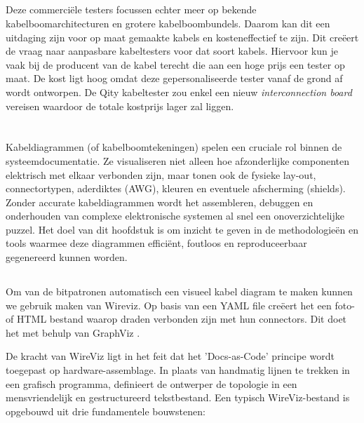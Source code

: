 \subsection{} 
\label{ssec:TesterOpMaat}

Deze commerciële testers focussen echter meer op bekende kabelboomarchitecturen en grotere kabelboombundels. Daarom kan dit een uitdaging zijn voor op maat gemaakte kabels\autocite{Khouri2021} en kosteneffectief te zijn. Dit creëert de vraag naar aanpasbare kabeltesters voor dat soort kabels. Hiervoor kun je vaak bij de producent van de kabel terecht die aan een hoge prijs een tester op maat. De kost ligt hoog omdat deze gepersonaliseerde tester vanaf de grond af wordt ontworpen. De Qity kabeltester zou enkel een nieuw \textit{interconnection board} vereisen waardoor de totale kostprijs lager zal liggen.

\section{} 
\label{sec:KabelDiagrammen}

Kabeldiagrammen (of kabelboomtekeningen) spelen een cruciale rol binnen de systeemdocumentatie. Ze visualiseren niet alleen hoe afzonderlijke componenten elektrisch met elkaar verbonden zijn, maar tonen ook de fysieke lay-out, connectortypen, aderdiktes (AWG), kleuren en eventuele afscherming (shields). Zonder accurate kabeldiagrammen wordt het assembleren, debuggen en onderhouden van complexe elektronische systemen al snel een onoverzichtelijke puzzel. Het doel van dit hoofdstuk is om inzicht te geven in de methodologieën en tools waarmee deze diagrammen efficiënt, foutloos en reproduceerbaar gegenereerd kunnen worden.


\subsection{} 
\label{ssec:wireviz}

Om van de bitpatronen automatisch een visueel kabel diagram te maken kunnen we gebruik maken van Wireviz. Op basis van een \gls{YAML} file creëert het een foto- of HTML bestand waarop draden verbonden zijn met hun connectors. Dit doet het met behulp van GraphViz \autocite{Wireviz2024}.

De kracht van WireViz ligt in het feit dat het 'Docs-as-Code' principe wordt toegepast op hardware-assemblage. In plaats van handmatig lijnen te trekken in een grafisch programma, definieert de ontwerper de topologie in een mensvriendelijk en gestructureerd tekstbestand. Een typisch WireViz-bestand is opgebouwd uit drie fundamentele bouwstenen:

